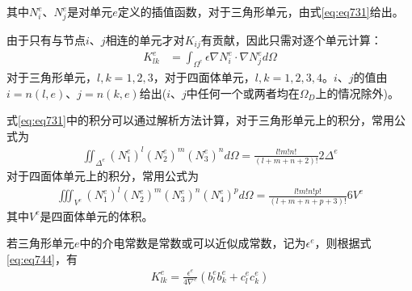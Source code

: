 \documentclass{article}
\numberwithin{equation}{section}
\begin{document}
其中$N_i^e$、$N_j^e$是对单元$e$定义的插值函数，对于三角形单元，由式\ref{eq:eq731}给出。\par
由于只有与节点$i$、$j$相连的单元才对$K_{ij}$有贡献，因此只需对逐个单元计算：
\begin{align}
    \label{eq:eq743}
    K_{lk}^e&=\int_{\Omega^e}\epsilon\nabla N_i^e\cdot\nabla N_j^ed\Omega
\end{align}
对于三角形单元，$l,k=1,2,3$，对于四面体单元，$l,k=1,2,3,4$。$i$、$j$的值由$i=n(l,e)$、$j=n(k,e)$给出($i$、$j$中任何一个或两者均在$\Omega_D$上的情况除外)。\par
式\ref{eq:eq731}中的积分可以通过解析方法计算，对于三角形单元上的积分，常用公式为
\begin{align}
    \label{eq:eq744}
    \iint_{\Delta^e}(N_1^e)^l(N_2^e)^m(N_3^e)^nd\Omega=\frac{l!m!n!}{(l+m+n+2)!}2\Delta^e
\end{align}
对于四面体单元上的积分，常用公式为
\begin{align}
    \label{eq:eq745}
    \iiint_{V^e}(N_1^e)^l(N_2^e)^m(N_3^e)^n(N_4^e)^pd\Omega=\frac{l!m!n!p!}{(l+m+n+p+3)!}6V^e
\end{align}
其中$V^e$是四面体单元的体积。\par
若三角形单元$e$中的介电常数是常数或可以近似成常数，记为$\epsilon^e$，则根据式\ref{eq:eq744}，有
\begin{align}
    \label{eq:eq765}
    K_{lk}^e=\frac{\epsilon^e}{4\nabla^e}\left(b_l^eb_k^e+c_l^ec_k^e\right)
\end{align}
\end{document}
